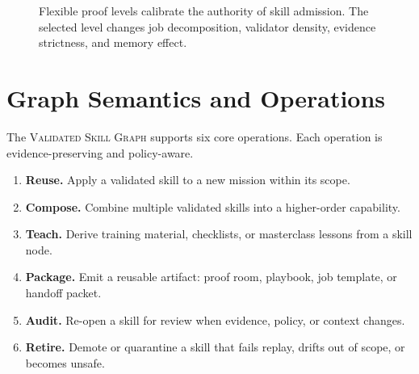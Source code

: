 \documentclass[10.5pt,oneside]{article}
\newcommand{\vsg}{\textsc{Validated Skill Graph}}
\begin{document}
\begin{figure}[H]
\begin{figureplate}
{}
\end{figureplate}
\caption{Flexible proof levels calibrate the authority of skill admission. The selected level changes job decomposition, validator density, evidence strictness, and memory effect.}
\label{fig:levels}
\end{figure}

\section{Graph Semantics and Operations}
The \vsg{} supports six core operations. Each operation is evidence-preserving and policy-aware.

\begin{enumerate}
  \item \textbf{Reuse.} Apply a validated skill to a new mission within its scope.
  \item \textbf{Compose.} Combine multiple validated skills into a higher-order capability.
  \item \textbf{Teach.} Derive training material, checklists, or masterclass lessons from a skill node.
  \item \textbf{Package.} Emit a reusable artifact: proof room, playbook, job template, or handoff packet.
  \item \textbf{Audit.} Re-open a skill for review when evidence, policy, or context changes.
  \item \textbf{Retire.} Demote or quarantine a skill that fails replay, drifts out of scope, or becomes unsafe.
\end{enumerate}
\end{document}
